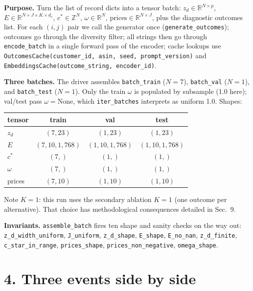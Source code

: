 \documentclass[11pt,a4paper]{article}
\begin{document}
\textbf{Purpose.} Turn the list of record dicts into a tensor batch:
$z_d \in \mathbb{R}^{N \times p}$,
$E \in \mathbb{R}^{N \times J \times K \times d_e}$,
$c^* \in \mathbb{Z}^{N}$, $\omega \in \mathbb{R}^{N}$,
$\text{prices} \in \mathbb{R}^{N \times J}$, plus the diagnostic
outcomes list. For each $(i, j)$ pair we call the generator once
(\texttt{generate\_outcomes}); outcomes go through the diversity
filter; all strings then go through \texttt{encode\_batch} in a single
forward pass of the encoder; cache lookups use
\texttt{OutcomesCache(customer\_id, asin, seed, prompt\_version)} and
\texttt{EmbeddingsCache(outcome\_string, encoder\_id)}.

\textbf{Three batches.} The driver assembles
\texttt{batch\_train} ($N = 7$), \texttt{batch\_val} ($N = 1$), and
\texttt{batch\_test} ($N = 1$). Only the train $\omega$ is populated
by subsample (1.0 here); val/test pass $\omega = \text{None}$, which
\texttt{iter\_batches} interprets as uniform 1.0. Shapes:
\begin{center}\small
\begin{tabular}{l c c c}\toprule
tensor & train & val & test \\
\midrule
$z_d$             & $(7, 23)$          & $(1, 23)$          & $(1, 23)$ \\
$E$               & $(7, 10, 1, 768)$  & $(1, 10, 1, 768)$  & $(1, 10, 1, 768)$ \\
$c^*$             & $(7,)$             & $(1,)$             & $(1,)$ \\
$\omega$          & $(7,)$             & $(1,)$             & $(1,)$ \\
prices            & $(7, 10)$          & $(1, 10)$          & $(1, 10)$ \\
\bottomrule
\end{tabular}\end{center}

Note $K = 1$: this run uses the secondary ablation $K = 1$ (one
outcome per alternative). That choice has methodological consequences
detailed in Sec.~9.

\textbf{Invariants.} \texttt{assemble\_batch} fires ten shape and
sanity checks on the way out: \texttt{z\_d\_width\_uniform},
\texttt{J\_uniform}, \texttt{z\_d\_shape}, \texttt{E\_shape},
\texttt{E\_no\_nan}, \texttt{z\_d\_finite},
\texttt{c\_star\_in\_range}, \texttt{prices\_shape},
\texttt{prices\_non\_negative}, \texttt{omega\_shape}.

\section*{4. Three events side by side}
\end{document}
